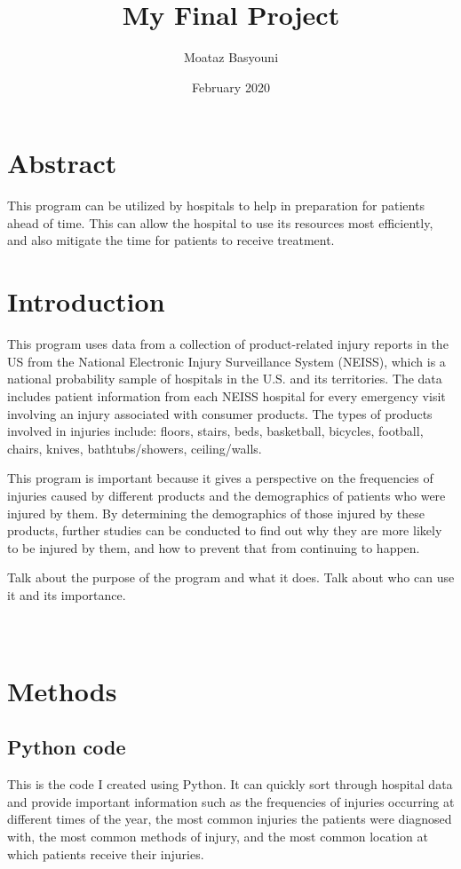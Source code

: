 \documentclass{article}
\title{My Final Project}
\author{Moataz Basyouni}
\date {February 2020}
\begin{document}
\maketitle

\section{Abstract}
This program can be utilized by hospitals to help in preparation for patients ahead of time. This can allow the hospital to use its resources most efficiently, and also mitigate the time for patients to receive treatment.
\newpage

\tableofcontents
\listoffigures
\newpage

\section{Introduction}
This program uses data from a collection of product-related injury reports in the US from the National Electronic Injury Surveillance System (NEISS), which is a national probability sample of hospitals in the U.S. and its territories. The data includes patient information from each NEISS hospital for every emergency visit involving an injury associated with consumer products. The types of products involved in injuries include: floors, stairs, beds, basketball, bicycles, football, chairs, knives, bathtubs/showers, ceiling/walls.

This program is important because it gives a perspective on the frequencies of injuries caused by different products and the demographics of patients who were injured by them. By determining the demographics of those injured by these products, further studies can be conducted to find out why they are more likely to be injured by them, and how to prevent that from continuing to happen.

Talk about the purpose of the program and what it does. Talk about who can use it and its importance.\\\\\\


\section{Methods}
\subsection{Python code}
This is the code I created using Python. It can quickly sort through hospital data and provide important information such as the frequencies of injuries occurring at different times of the year, the most common injuries the patients were diagnosed with, the most common methods of injury, and the most common location at which patients receive their injuries.\\
\end{document}
